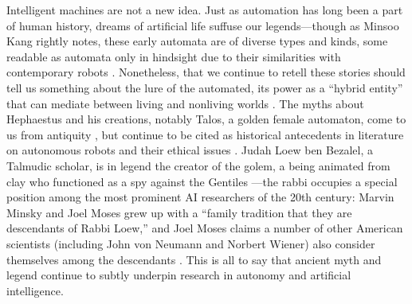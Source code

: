 
Intelligent machines are not a new idea. Just as automation has long
been a part of human history, dreams of artificial life suffuse our
legends---though as Minsoo Kang
rightly notes, these early automata are of diverse types and kinds,
some readable as automata only in hindsight due to their
similarities with contemporary robots \cite[p. 15]{kang}.
Nonetheless, that we continue 
to retell these stories should tell us something about the
lure of the automated, its power as a ``hybrid entity'' that can
mediate between living and nonliving worlds \cite[p. 19]{kang}.
The myths about Hephaestus and 
his creations, notably Talos, a golden female automaton, come to us
from antiquity \cite[Ch. 1]{mccorduck}, but continue to be cited as
historical antecedents in 
literature on autonomous robots and their ethical issues \cite[p.
  3]{patrickLin}. Judah Loew ben Bezalel, a Talmudic
scholar, is in legend the 
creator of the golem, a being animated from clay who functioned as a
spy against the Gentiles \cite[Ch. 1]{mccorduck}---the rabbi occupies
a special position among the most 
prominent AI researchers of the 20th century: Marvin Minsky and Joel
Moses grew up with a ``family tradition 
that they are descendants of Rabbi Loew,'' and Joel Moses claims a number of
other American scientists (including John von Neumann and Norbert
Wiener) also consider themselves among the descendants \cite[Ch.
  1]{mccorduck}. This is all 
to say that ancient myth and legend continue to subtly underpin
research in autonomy and artificial intelligence.


